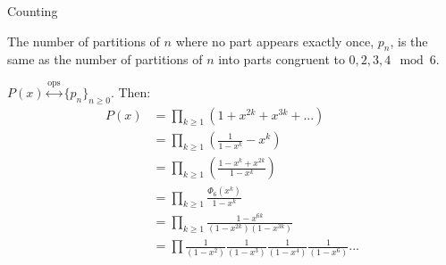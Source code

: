 \documentclass[]{beamer}
\newcommand{\ops}{\overset{\text{ops}}{\leftrightarrow}}
\begin{document}
\begin{frame}[allowframebreaks]{Counting}
	\begin{theorem}[Schur, 1926]
		The number of partitions of $n$ where no part appears exactly once, $p_n$, is the same as the number of partitions of $n$ into parts congruent to $0, 2, 3, 4 \mod 6$. 
	\end{theorem}
		$P(x) \ops \lbrace p_n \rbrace_{n \geq 0}$.
		Then:
		\begin{align*}
			P(x) &= \prod_{k \geq 1}(1 + x^{2k} + x^{3k} + ...)\\
			&= \prod_{k \geq 1}\left(\frac{1}{1-x^k} - x^k\right)\\
			&= \prod_{k \geq 1} \left(\frac{1 - x^k + x^{2k}}{1-x^k}\right)\\
			&= \prod_{k \geq 1} \frac{\Phi_6(x^k)}{1-x^k}\\
			&= \prod_{k \geq 1} \frac{1 - x^{6k}}{(1 - x^{2k})(1 - x^{3k})}\\
			&= \prod \frac{1}{(1 - x^{2})}\frac{1}{(1 - x^{3})}\frac{1}{(1 - x^{4})}\frac{1}{(1 - x^{6})}...
		\end{align*}
\end{frame}
\end{document}
